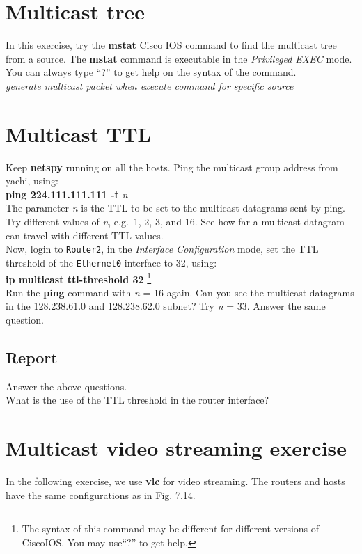 \documentclass{../UTNetLab}
\begin{document}
\section{Multicast tree}
    In this exercise, try the \textbf{mstat} Cisco IOS command to find the multicast tree from a source.
    The \textbf{mstat} command is executable in the \textit{Privileged EXEC} mode.
    You can always type “?” to get help on the syntax of the command.\\
    \textit{generate multicast packet when execute command for specific source}

\section{Multicast TTL}
    Keep \textbf{netspy} running on all the hosts.
    Ping the multicast group address from yachi, using: \\
    \textbf{ping 224.111.111.111 -t} \textit{n} \\
    The parameter \textit{n} is the TTL to be set to the multicast datagrams sent by ping.
    Try different values of \textit{n}, e.g.\  1, 2, 3, and 16.
    See how far a multicast datagram can travel with different TTL values. \\
    Now, login to \texttt{Router2}, in the \textit{Interface Configuration} mode, set the TTL threshold of the \texttt{Ethernet0} interface to 32, using: \\
    \textbf{ip multicast ttl-threshold 32}
    \footnote{The syntax of this command may be different for different versions of CiscoIOS. You may use“?” to get help.} \\
    Run the \textbf{ping} command with \textit{n} = 16 again.
    Can you see the multicast datagrams in the 128.238.61.0 and 128.238.62.0 subnet?
    Try \textit{n} = 33.
    Answer the same question.
    \subsection*{Report}
    Answer the above questions. \\
    What is the use of the TTL threshold in the router interface?

\section*{Multicast video streaming exercise}
    In the following exercise, we use \textbf{vlc} for video streaming.
    The routers and hosts have the same configurations as in Fig. 7.14.
\end{document}
